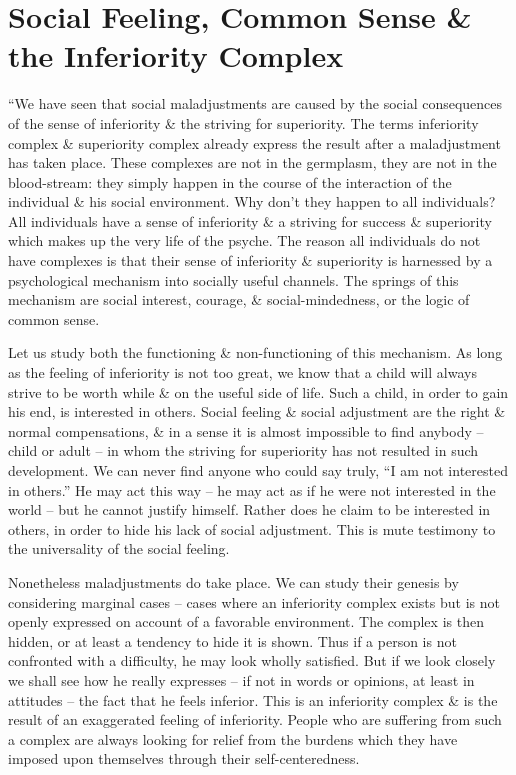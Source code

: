 \documentclass{article}
\begin{document}

\section{Social Feeling, Common Sense \& the Inferiority Complex}
``We have seen that social maladjustments are caused by the social consequences of the sense of inferiority \& the striving for superiority. The terms inferiority complex \& superiority complex already express the result after a maladjustment has taken place. These complexes are not in the germplasm, they are not in the blood-stream: they simply happen in the course of the interaction of the individual \& his social environment. Why don't they happen to all individuals? All individuals have a sense of inferiority \& a striving for success \& superiority which makes up the very life of the psyche. The reason all individuals do not have complexes is that their sense of inferiority \& superiority is harnessed by a psychological mechanism into socially useful channels. The springs of this mechanism are social interest, courage, \& social-mindedness, or the logic of common sense.

Let us study both the functioning \& non-functioning of this mechanism. As long as the feeling of inferiority is not too great, we know that a child will always strive to be worth while \& on the useful side of life. Such a child, in order to gain his end, is interested in others. Social feeling \& social adjustment are the right \& normal compensations, \& in a sense it is almost impossible to find anybody -- child or adult -- in whom the striving for superiority has not resulted in such development. We can never find anyone who could say truly, ``I am not interested in others.'' He may act this way -- he may act as if he were not interested in the world -- but he cannot justify himself. Rather does he claim to be interested in others, in order to hide his lack of social adjustment. This is mute testimony to the universality of the social feeling.

Nonetheless maladjustments do take place. We can study their genesis by considering marginal cases -- cases where an inferiority complex exists but is not openly expressed on account of a favorable environment. The complex is then hidden, or at least a tendency to hide it is shown. Thus if a person is not confronted with a difficulty, he may look wholly satisfied. But if we look closely we shall see how he really expresses -- if not in words or opinions, at least in attitudes -- the fact that he feels inferior. This is an inferiority complex \& is the result of an exaggerated feeling of inferiority. People who are suffering from such a complex are always looking for relief from the burdens which they have imposed upon themselves through their self-centeredness.
\end{document}
